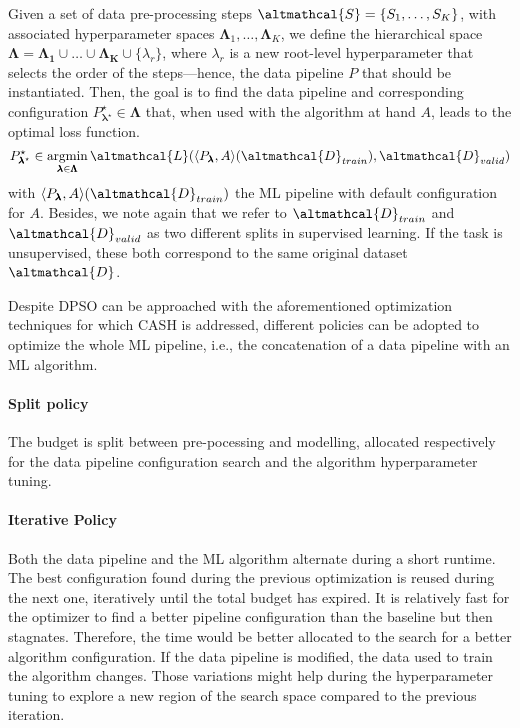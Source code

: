 \begin{definition}
    Given a set of data pre-processing steps $\altmathcal{S} = \{S_1, \dots, S_K\}$, with associated hyperparameter spaces  $\pmb{\Lambda}_1, \dots, \pmb{\Lambda}_K$, we define the hierarchical space $\pmb{\Lambda} = \pmb{\Lambda_1} \cup \dots \cup \pmb{\Lambda_K} \cup \{\lambda_r\}$, where $\lambda_r$ is a new root-level hyperparameter that selects the order of the steps---hence, the data pipeline $P$ that should be instantiated. Then, the goal is to find the data pipeline and corresponding configuration $P^{\star}_{\pmb{\lambda}^{\star}} \in \pmb{\Lambda}$ that, when used with the algorithm at hand $A$, leads to the optimal loss function.
    \begin{equation*}
        P^{\star}_{\pmb{\lambda}^{\star}} \in \argmin_{\pmb{\lambda} \in \pmb{\Lambda}} \altmathcal{L}(\langle P_{\pmb{\lambda}}, A \rangle (\altmathcal{D}_{train}), \altmathcal{D}_{valid})
    \end{equation*}
    with $\langle P_{\pmb{\lambda}}, A \rangle (\altmathcal{D}_{train})$ the ML pipeline with default configuration for $A$.
    Besides, we note again that we refer to $\altmathcal{D}_{train}$ and $\altmathcal{D}_{valid}$ as two different splits in supervised learning. If the task is unsupervised, these both correspond to the same original dataset $\altmathcal{D}$.
\end{definition}

Despite DPSO can be approached with the aforementioned optimization techniques for which CASH is addressed, different policies can be adopted to optimize the whole ML pipeline, i.e., the concatenation of a data pipeline with an ML algorithm.

\paragraph{Split policy}
The budget is split between pre-pocessing and modelling, allocated respectively for the data pipeline configuration search and the algorithm hyperparameter tuning.

\paragraph{Iterative Policy}
Both the data pipeline and the ML algorithm alternate during a short runtime.
The best configuration found during the previous optimization is reused during the next one, iteratively until the total budget has expired.
It is relatively fast for the optimizer to find a better pipeline configuration than the baseline but then stagnates.
Therefore, the time would be better allocated to the search for a better algorithm configuration.
If the data pipeline is modified, the data used to train the algorithm changes.
Those variations might help during the hyperparameter tuning to explore a new region of the search space compared to the previous iteration.

